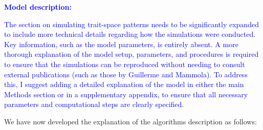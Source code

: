 \documentclass[
]{article}
\begin{document}
\textcolor{blue}{\textbf{Model description:}}

\textcolor{blue}{The section on simulating trait-space patterns needs to be significantly expanded to include more technical details regarding how the simulations were conducted.
Key information, such as the model parameters, is entirely absent.
A more thorough explanation of the model setup, parameters, and procedures is required to ensure that the simulations can be reproduced without needing to consult external publications (such as those by Guillerme and Mammola).
To address this, I suggest adding a detailed explanation of the model in either the main Methods section or in a supplementary appendix, to ensure that all necessary parameters and computational steps are clearly specified.}

We have now developed the explanation of the algorithms description as follows:
\end{document}
